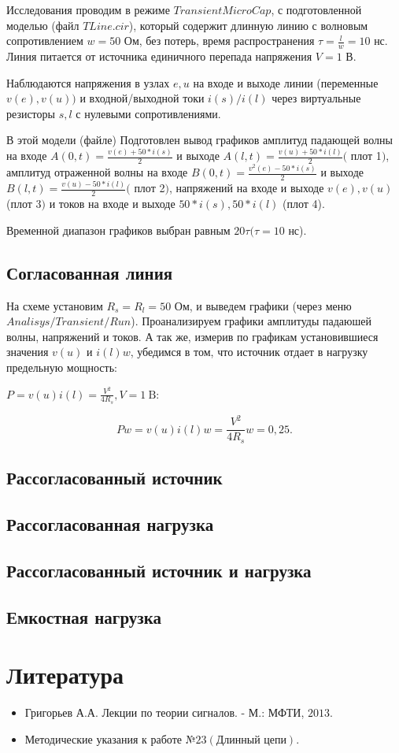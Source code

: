 \documentclass[a4paper, 14pt]{extarticle}%
\begin{document}
Исследования проводим в режиме $Transient MicroCap$, с подготовленной моделью (файл $TLine.cir$), который содержит длинную линию с волновым сопротивлением $w = 50$ Ом, без потерь, время распространения $\tau=\frac{l}{w}=10$ нс. Линия питается от источника единичного перепада напряжения $V=1$ В.

Наблюдаются напряжения в узлах $e, u$ на входе и выходе линии (переменные $v(e), v(u))$ и входной/выходной токи $i(s) / i(l)$ через виртуальные резисторы $s, l$ с нулевыми сопротивлениями.

В этой модели (файле) Подготовлен вывод графиков амплитуд падающей волны на входе $A(0, t)=\frac{v(e)+50 * i(s)}{2}$ и выходе $A(l, t)=\frac{v(u)+50 * i(l)}{2}($ плот 1$)$, амплитуд отраженной волны на входе $B(0, t)=\frac{v^{2}(e)-50 * i(s)}{2}$ и выходе $B(l, t)=\frac{v(u)-50 * i(l)}{2}($ плот 2$)$, напряжений на входе и выходе $v(e), v(u)$ (плот 3$)$ и токов на входе и выходе $50 * i(s), 50 * i(l)$ (плот 4). 

Временной диапазон графиков выбран равным $20 \tau (\tau = 10$ нс). 


\subsection{Согласованная линия}

На схеме установим $R_{s}=R_{l}=50$ Ом, и выведем графики (через меню $Analisys/Transient/Run$). Проанализируем графики амплитуды падаюшей волны, напряжений и токов. А так же, измерив по графикам установившиеся значения $v(u)$ и $i(l) w$, убедимся в том, что источник отдает в нагрузку предельную мощность:

$P=v(u) i(l)=\frac{V^{2}}{4 R_{s}}, V=1 \mathrm{~B}:$

\[P w=v(u) i(l) w=\frac{V^{2}}{4 R_{s}} w=0,25 .\]



\subsection{Рассогласованный источник}


\subsection{Рассогласованная нагрузка}


\subsection{Рассогласованный источник и нагрузка}


\subsection{Емкостная нагрузка}


\section{Литература}

\begin{itemize}

\item Григорьев А.А. Лекции по теории сигналов. - М.: МФТИ, $2013 .$

\item Методические указания к работе №$23 (\text{Длинный цепи})$.

\end{itemize}
\end{document}
